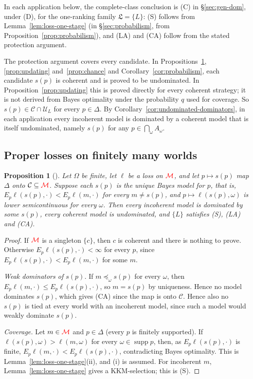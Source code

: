 \documentclass[11pt]{article}
\newcommand{\chg}[1]{{\color{red}#1}}
\newcommand{\chgb}[1]{{\color{violet}#1}}
\newtheorem{proposition}[theorem]{Proposition}
\theoremstyle{definition}
\theoremstyle{remark}
\newcommand{\M}{\mathcal M}
\newcommand{\C}{\mathcal C}
\newcommand{\U}{\mathcal U}
\newcommand{\Lf}{\mathfrak L}
\newcommand{\supp}{\operatorname{supp}}
\begin{document}
\chg{In each application below, the complete-class conclusion is (C) in \S\ref{sec:gen-dom}, under (D), for the one-ranking family $\Lf=\{L\}$: (S) follows from Lemma~\ref{lem:loss-one-stage}\chgb{ (in \S\ref{sec:probabilism}, from Proposition~\ref{prop:probabilism})}, and (LA) and (CA) follow from the stated protection argument.}

The protection argument covers every candidate. In Propositions~\ref{prop:proper}, \ref{prop:updating} and~\ref{prop:chance}\chgb{ and Corollary~\ref{cor:probabilism}}, each candidate $s(p)$ is coherent and is proved to be undominated. In Proposition~\ref{prop:updating} this is proved directly for every coherent strategy; it is not derived from Bayes optimality under the probability $q$ used for coverage. So $s(p)\in\C\cap\U_L$ for every $p\in\Delta$. By Corollary~\ref{cor:undominated-dominators}, in each application every incoherent model is dominated by a coherent model that is itself undominated, namely $s(p)$ for any $p\in\bigcap_\omega A_\omega$.

\subsection{Proper losses on finitely many worlds}

\begin{proposition}[{\cite{Predd2009,Pettigrew2022}}]\label{prop:proper}
Let $\Omega$ be finite, let $\ell$ be a loss on $\chg{\M}$, and let $p\mapsto s(p)$ map $\Delta$ onto $\C\subseteq\chg{\M}$. Suppose each $s(p)$ is the unique Bayes model for $p$, that is, $E_p\ell(s(p),\cdot)<E_p\ell(m,\cdot)$ for every $m\ne s(p)$, and $p\mapsto\ell(s(p),\omega)$ is lower semicontinuous for every $\omega$. Then every incoherent model is dominated by some $s(p)$, every coherent model is undominated, and $\{L\}$ satisfies \chg{(S), (LA) and (CA)}.
\end{proposition}
\begin{proof}
If $\chg{\M}$ is a singleton $\{c\}$, then $c$ is coherent and there is nothing to prove. Otherwise $E_p\ell(s(p),\cdot)<\infty$ for every $p$, since $E_p\ell(s(p),\cdot)<E_p\ell(m,\cdot)$ for some $m$.

\emph{Weak dominators of $s(p)$.} If $m\preceq_\omega s(p)$ for every $\omega$, then $E_p\ell(m,\cdot)\le E_p\ell(s(p),\cdot)$, so $m=s(p)$ by uniqueness. Hence no model dominates $s(p)$, which gives \chg{(CA)} since the map is onto $\C$. Hence also no $s(p)$ is tied at every world with an incoherent model, since such a model would weakly dominate $s(p)$.

\emph{Coverage.} Let $m\in\chg{\M}$ and $p\in\Delta$ (every $p$ is finitely supported). If $\ell(s(p),\omega)>\ell(m,\omega)$ for every $\omega\in\supp p$, then, as $E_p\ell(s(p),\cdot)$ is finite, $E_p\ell(m,\cdot)<E_p\ell(s(p),\cdot)$, contradicting Bayes optimality. This is Lemma~\ref{lem:loss-one-stage}(ii), and (i) is assumed. For incoherent $m$, Lemma~\ref{lem:loss-one-stage} gives a KKM-selection; this is \chg{(S)}.
\end{proof}
\end{document}
